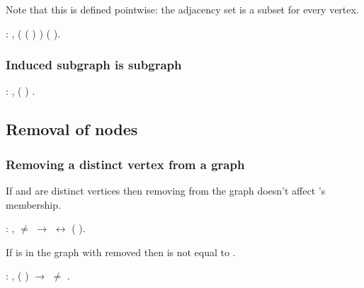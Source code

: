  Note that this is defined pointwise: the adjacency set is a subset
    for every vertex.
\begin{coqdoccode}
\coqdocemptyline
\coqdocnoindent
{}  : \coqdockw{\ensuremath{\forall}}   ,\coqdoceol
\coqdocindent{2.00em}
 ( (  ) ) (  ).\coqdoceol
\coqdocemptyline
\end{coqdoccode}
\subsubsection{Induced subgraph is subgraph}


\begin{coqdoccode}
\coqdocemptyline
\coqdocnoindent
{}  : \coqdockw{\ensuremath{\forall}}  ,  (  ) .\coqdoceol
\coqdocemptyline
\end{coqdoccode}
\subsection{Removal of nodes}

\subsubsection{Removing a distinct vertex from a graph}

 If  and  are distinct vertices then removing  from the
    graph doesn't affect 's membership.
\begin{coqdoccode}
\coqdocemptyline
\coqdocnoindent
{}  : \coqdockw{\ensuremath{\forall}}   ,  \ensuremath{\not=}  \ensuremath{\rightarrow}    \ensuremath{\leftrightarrow}   (  ).\coqdoceol
\coqdocemptyline
\end{coqdoccode}
If  is in the graph with  removed then  is not equal to .
\begin{coqdoccode}
\coqdocemptyline
\coqdocnoindent
{}  : \coqdockw{\ensuremath{\forall}}   ,   (  ) \ensuremath{\rightarrow}  \ensuremath{\not=} .\coqdoceol
\coqdocemptyline
\end{coqdoccode}

